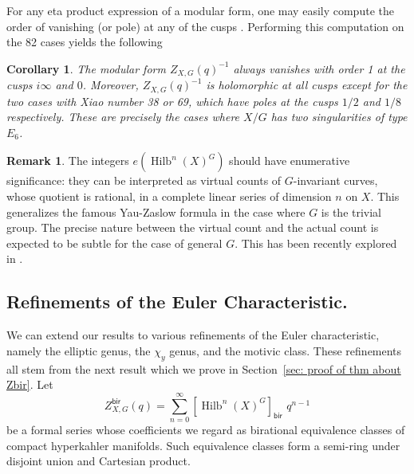 \documentclass{amsart}
\newtheorem{corollary}[theorem]{Corollary}
\theoremstyle{definition}
\newtheorem{remark}[theorem]{Remark}
\newcommand{\bir}{\mathsf{bir}}
\newcommand{\Hilb}{\operatorname{Hilb}}
\begin{document}
For any eta product expression of a modular form, one may easily
compute the order of vanishing (or pole) at any of the cusps
\cite[Cor~2.2]{kohler2011eta}. Performing this computation on the 82
cases yields the following

\begin{corollary}\label{cor: vanishing at cusps}
The modular form $Z_{X,G}(q)^{-1}$ always vanishes with order 1 at the cusps
$i\infty$ and $0$. Moreover,
$Z_{X,G}(q)^{-1}$ is holomorphic at all cusps except for the two cases with
Xiao number 38 or 69, which have poles at the cusps $1/2$ and $1/8$
respectively. These are precisely the cases where $X/G$ has two
singularities of type $E_{6}$.
\end{corollary}

\begin{remark}\label{rem: enumerative interpretation}
The integers $e\left(\Hilb^{n}(X)^{G} \right)$ should have enumerative
significance: they can be interpreted as virtual counts of
$G$-invariant curves, whose quotient is rational, in a complete linear
series of dimension $n$ on $X$. This generalizes the famous Yau-Zaslow
formula in the case where $G$ is the trivial group. The precise nature
between the virtual count and the actual count is expected to be
subtle for the case of general $G$. This has been recently explored in
\cite{Zhan-2019-counting-curves-on-K3}.
\end{remark}


\subsection{Refinements of the Euler Characteristic.}
We can extend our results to various refinements of the Euler
characteristic, namely the elliptic genus, the $\chi_{y}$ genus, and
the motivic class. These refinements all stem from the next
result which we prove in Section~\ref{sec: proof of thm about Zbir}. Let 
\[
Z^{\bir}_{X,G}(q) = \sum_{n=0}^{\infty} [\Hilb^{n}(X)^{G}]_{\bir} \,
\, q^{n-1}
\]
be a formal series whose coefficients we regard as birational
equivalence classes of compact hyperkahler manifolds. Such equivalence
classes form a semi-ring under disjoint union and Cartesian
product.
\end{document}
